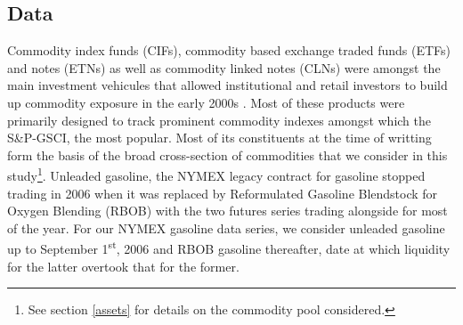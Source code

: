 \documentclass[12pt,]{article}
\let\rmarkdownfootnote\footnote%
\def\footnote{\protect\rmarkdownfootnote}
\begin{document}
\hypertarget{data}{%
\subsection{Data}\label{data}}

Commodity index funds (CIFs), commodity based exchange traded funds
(ETFs) and notes (ETNs) as well as commodity linked notes (CLNs) were
amongst the main investment vehicules that allowed institutional and
retail investors to build up commodity exposure in the early 2000s
\citep{boons_stock_2012, henderson_new_2015, irwin_index_2011, unctad_global_2009, schumann_hunger-makers_2011}.
Most of these products were primarily designed to track prominent
commodity indexes amongst which the S\&P-GSCI, the most popular. Most of
its constituents at the time of writting form the basis of the broad
cross-section of commodities that we consider in this study\footnote{See
  section \ref{assets} for details on the commodity pool considered.}.
Unleaded gasoline, the NYMEX legacy contract for gasoline stopped
trading in 2006 when it was replaced by Reformulated Gasoline Blendstock
for Oxygen Blending (RBOB) with the two futures series trading alongside
for most of the year. For our NYMEX gasoline data series, we consider
unleaded gasoline up to September 1\textsuperscript{st}, 2006 and RBOB
gasoline thereafter, date at which liquidity for the latter overtook
that for the former.
\end{document}
